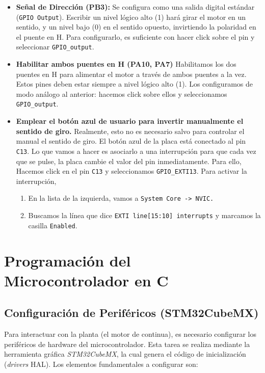 \documentclass[10pt,a4paper]{report}
\begin{document}
\begin{itemize}
 
	\item \textbf{Señal de Dirección (PB3):} Se configura como una salida digital estándar (\texttt{GPIO Output}). Escribir un nivel lógico alto (1) hará girar el motor en un sentido, y un nivel bajo (0) en el sentido opuesto, invirtiendo la polaridad en el puente en H.
	Para configurarlo, es suficiente con hacer click sobre el pin y seleccionar \texttt{GPIO\_output}.
	
	\item \textbf{Habilitar ambos puentes en H (PA10, PA7)} Habilitamos los dos puentes en H para alimentar el motor a través de ambos puentes a la vez. Estos pines deben estar siempre a nivel lógico alto (1). Los configuramos de modo análogo al anterior: hacemos click sobre ellos y seleccionamos \texttt{GPIO\_output}.
	\item \textbf{Emplear el botón azul de usuario para invertir manualmente el sentido de giro.}
Realmente, esto no es necesario salvo para controlar el manual el sentido de giro. El botón azul de la placa está conectado al pin \texttt{C13}. Lo que vamos a hacer es asociarlo a una interrupción para que cada vez que se pulse, la placa cambie el valor del pin inmediatamente. Para ello, Hacemos click en el pin \texttt{C13} y seleccionamos \texttt{GPIO\_EXTI13}. Para activar la interrupción,
\begin{enumerate}
	\item En la lista de la izquierda, vamos a \texttt{System Core -> NVIC.}
	\item Buscamos la línea que dice \texttt{EXTI line[15:10] interrupts} y marcamos la casilla \texttt{Enabled}.
\end{enumerate}

\end{itemize}



\chapter{Programación del Microcontrolador en C}



\section{Configuración de Periféricos (STM32CubeMX)}
Para interactuar con la planta (el motor de continua), es necesario configurar los periféricos de hardware del microcontrolador. Esta tarea se realiza mediante la herramienta gráfica \textit{STM32CubeMX}, la cual genera el código de inicialización (\textit{drivers} HAL). Los elementos fundamentales a configurar son:
\end{document}
